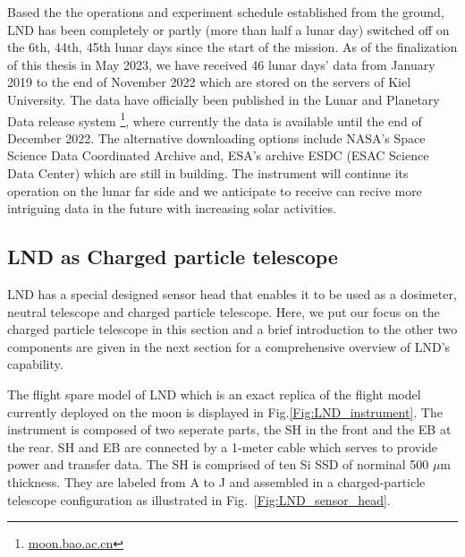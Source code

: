 Based the the operations and experiment schedule established from the ground, \ac{LND} has been completely or partly (more than half a lunar day) switched off on the 6th, 44th, 45th lunar days since the start of the mission. As of the finalization of this thesis in May 2023, we have received 46 lunar days' data from January 2019 to the end of November 2022 which are stored on the servers of Kiel University. The data have officially been published in the Lunar and Planetary Data release system \footnote{\url{moon.bao.ac.cn}}, where currently the data is available until the end of December 2022. 
The alternative downloading options include \ac{NASA}'s Space Science Data Coordinated Archive and, \ac{ESA}'s archive ESDC (ESAC Science Data Center) which are still in building. The instrument will continue its operation on the lunar far side and we anticipate to receive can recive more intriguing data in the future with increasing solar activities.



\subsection{LND as Charged particle telescope}

\ac{LND} has a special designed sensor head that enables it to be used as a dosimeter, neutral telescope and charged particle telescope. Here, we put our focus on the charged particle telescope in this section and a brief introduction to the other two components are given in the next section for a comprehensive overview of LND's capability.

The flight spare model of \ac{LND} which is an exact replica of the flight model currently deployed on the moon is displayed in Fig.\ref{Fig:LND_instrument}. The instrument is composed of two seperate parts, the \ac{SH} in the front and the \ac{EB} at the rear. \ac{SH} and \ac{EB} are connected by a 1-meter cable which serves to provide power and transfer data. 
The \ac{SH} is comprised of ten Si \acs{SSD} of norminal 500 $\mu$m thickness. They are labeled from A to J and assembled in a charged-particle telescope configuration as illustrated in Fig.~\ref{Fig:LND_sensor_head}.


